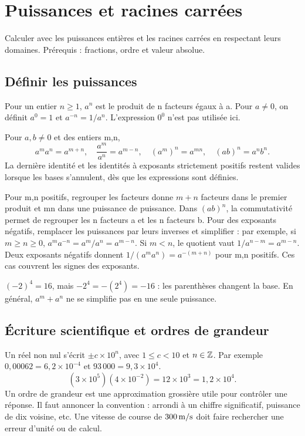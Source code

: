 \documentclass[../cours_2de.tex]{subfiles}
\begin{document}
\setcounter{chapter}{3}
\chapter{Puissances et racines carrées}
\label{sec:ch04}
\begin{objectif}
Calculer avec les puissances entières et les racines carrées en respectant leurs domaines. Prérequis : fractions, ordre et valeur absolue.
\end{objectif}
\section{Définir les puissances}
Pour un entier $n\ge1$, $a^n$ est le produit de n facteurs égaux à a. Pour $a\ne0$, on définit $a^0=1$ et $a^{-n}=1/a^n$. L'expression $0^0$ n'est pas utilisée ici.
\begin{propriete}
Pour $a,b\ne0$ et des entiers m,n,
\[
a^ma^n=a^{m+n},\quad \frac{a^m}{a^n}=a^{m-n},\quad
(a^m)^n=a^{mn},\quad (ab)^n=a^nb^n.
\]
La dernière identité et les identités à exposants strictement positifs restent valides lorsque les bases s'annulent, dès que les expressions sont définies.
\end{propriete}
\begin{demonstration}
Pour m,n positifs, regrouper les facteurs donne $m+n$ facteurs dans le premier produit et mn dans une puissance de puissance. Dans $(ab)^n$, la commutativité permet de regrouper les n facteurs a et les n facteurs b. Pour des exposants négatifs, remplacer les puissances par leurs inverses et simplifier : par exemple, si $m\ge n\ge0$, $a^ma^{-n}=a^m/a^n=a^{m-n}$. Si $m<n$, le quotient vaut $1/a^{n-m}=a^{m-n}$. Deux exposants négatifs donnent $1/(a^ma^n)=a^{-(m+n)}$ pour m,n positifs. Ces cas couvrent les signes des exposants.
\end{demonstration}
\begin{attention}
$(-2)^4=16$, mais $-2^4=-(2^4)=-16$ : les parenthèses changent la base. En général, $a^m+a^n$ ne se simplifie pas en une seule puissance.
\end{attention}
\section{Écriture scientifique et ordres de grandeur}
Un réel non nul s'écrit $\pm c\times10^n$, avec $1\le c<10$ et $n\in\mathbb{Z}$. Par exemple $0{,}00062=6{,}2\times10^{-4}$ et $93\,000=9{,}3\times10^4$.
\[
(3\times10^5)(4\times10^{-2})=12\times10^3=1{,}2\times10^4.
\]
Un ordre de grandeur est une approximation grossière utile pour contrôler une réponse. Il faut annoncer la convention : arrondi à un chiffre significatif, puissance de dix voisine, etc. Une vitesse de course de $300\,\mathrm{m/s}$ doit faire rechercher une erreur d'unité ou de calcul.
\end{document}
